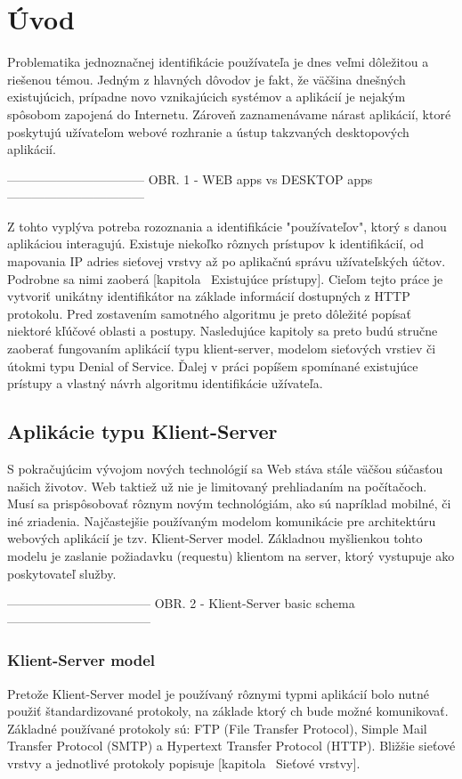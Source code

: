 \documentclass[
  printed, %
  table,   %
  lof,     %
  lot,     %
]{fithesis3}
\begin{document}
\chapter{Úvod}
Problematika jednoznačnej identifikácie používateľa je dnes veľmi
dôležitou a riešenou témou. Jedným z hlavných dôvodov je fakt, že väčšina
dnešných existujúcich, prípadne novo vznikajúcich systémov a aplikácií je
nejakým spôsobom zapojená do Internetu. Zároveň zaznamenávame nárast
aplikácií, ktoré poskytujú užívateľom webové rozhranie a ústup takzvaných
desktopových aplikácií.

---------------------------------
OBR. 1 - WEB apps vs DESKTOP apps
---------------------------------

	Z tohto vyplýva potreba rozoznania a identifikácie "používateľov", ktorý s
danou aplikáciou interagujú. Existuje niekoľko rôznych prístupov k 
identifikácií, od mapovania IP adries sieťovej vrstvy až po aplikačnú správu
užívateľských účtov. Podrobne sa nimi zaoberá [kapitola ~Existujúce prístupy].
Cieľom tejto práce je vytvoriť unikátny identifikátor na základe informácií
dostupných z HTTP protokolu. Pred zostavením samotného algoritmu je preto
dôležité popísať niektoré kľúčové oblasti a postupy.
Nasledujúce kapitoly sa preto budú stručne zaoberať fungovaním aplikácií typu
klient-server, modelom sieťových vrstiev či útokmi typu Denial of Service.
Ďalej v práci popíšem spomínané existujúce prístupy a vlastný návrh algoritmu 
identifikácie užívateľa. 

\section{Aplikácie typu Klient-Server}
	S pokračujúcim vývojom nových technológií sa Web stáva stále väčšou súčasťou
našich životov. Web taktiež už nie je limitovaný prehliadaním na počítačoch.
Musí sa prispôsobovať rôznym novým technológiám, ako sú napríklad mobilné, či
iné zriadenia. Najčastejšie používaným modelom komunikácie pre architektúru
webových aplikácií je tzv. Klient-Server model. Základnou myšlienkou tohto modelu
je zaslanie požiadavku (requestu) klientom na server, ktorý vystupuje ako
poskytovateľ služby.

-----------------------------------
OBR. 2 - Klient-Server basic schema
-----------------------------------

\subsection{Klient-Server model}
Pretože Klient-Server model je používaný rôznymi typmi aplikácií bolo nutné použiť
štandardizované protokoly, na základe ktorý ch bude možné komunikovať. Základné
používané protokoly sú: FTP (File Transfer Protocol), Simple Mail Transfer Protocol
(SMTP) a Hypertext Transfer Protocol (HTTP). Bližšie sieťové vrstvy a jednotlivé
protokoly popisuje [kapitola ~Sieťové vrstvy].
\end{document}
